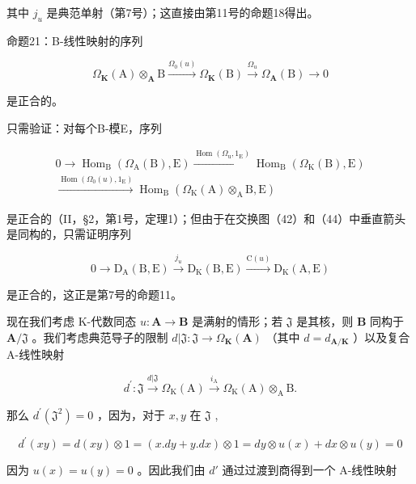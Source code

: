 其中 \(j_{u}\) 是典范单射（第7号）；这直接由第11号的命题18得出。

命题21：B-线性映射的序列

\[
\Omega_ {\mathbf {K}} (\mathrm{A}) \otimes_ {\mathbf {A}} \mathrm{B} \xrightarrow {\Omega_ {0} (u)} \Omega_ {\mathbf {K}} (\mathrm{B}) \xrightarrow {\Omega_ {u}} \Omega_ {\mathbf {A}} (\mathrm{B}) \to 0\tag{45}
\]

是正合的。

只需验证：对每个B-模E，序列

\[
\begin{array}{c} 0 \to \operatorname{Hom} _ {\mathrm{B}} (\Omega_ {\mathrm{A}} (\mathrm{B}), \mathrm{E}) \xrightarrow {\operatorname{Hom} (\Omega_ {\mathrm{u}} , 1 _ {\mathrm{E}})} \operatorname{Hom} _ {\mathrm{B}} (\Omega_ {\mathrm{K}} (\mathrm{B}), \mathrm{E}) \\ \xrightarrow {\operatorname{Hom} (\Omega_ {0} (u) , 1 _ {\mathrm{E}})} \operatorname{Hom} _ {\mathrm{B}} (\Omega_ {\mathrm{K}} (\mathrm{A}) \otimes_ {\mathrm{A}} \mathrm{B}, \mathrm{E}) \end{array}
\]

是正合的（II，§2，第1号，定理1）；但由于在交换图（42）和（44）中垂直箭头是同构的，只需证明序列

\[
0 \longrightarrow \mathrm{D} _ {\mathrm{A}} (\mathrm{B}, \mathrm{E}) \xrightarrow {j _ {u}} \mathrm{D} _ {\mathrm{K}} (\mathrm{B}, \mathrm{E}) \xrightarrow {\mathrm{C} (u)} \mathrm{D} _ {\mathrm{K}} (\mathrm{A}, \mathrm{E})
\]

是正合的，这正是第7号的命题11。

现在我们考虑 K-代数同态 \(u: \mathbf{A} \to \mathbf{B}\) 是满射的情形；若 \(\mathfrak{J}\) 是其核，则 \(\mathbf{B}\) 同构于 \(\mathbf{A} / \mathfrak{J}\) 。我们考虑典范导子的限制 \(d| \mathfrak{J}: \mathfrak{J} \to \Omega_{\mathbf{K}}(\mathbf{A})\) （其中 \(d = d_{\mathbf{A} / \mathbf{K}}\) ）以及复合 A-线性映射

\[
d ^ {\prime}: \mathfrak {J} \xrightarrow {d | \mathfrak {J}} \Omega_ {\mathrm{K}} (\mathrm{A}) \xrightarrow {i _ {\mathrm{A}}} \Omega_ {\mathrm{K}} (\mathrm{A}) \otimes_ {\mathrm{A}} \mathrm{B}.
\]

那么 \(d^{\prime}(\mathfrak{J}^{2}) = 0\) ，因为，对于 \(x, y\) 在 \(\mathfrak{J}\) ,

\[
d ^ {\prime} (x y) = d (x y) \otimes 1 = (x. d y + y. d x) \otimes 1 = d y \otimes u (x) + d x \otimes u (y) = 0
\]

因为 \(u(x) = u(y) = 0\) 。因此我们由 \(d'\) 通过过渡到商得到一个 A-线性映射

